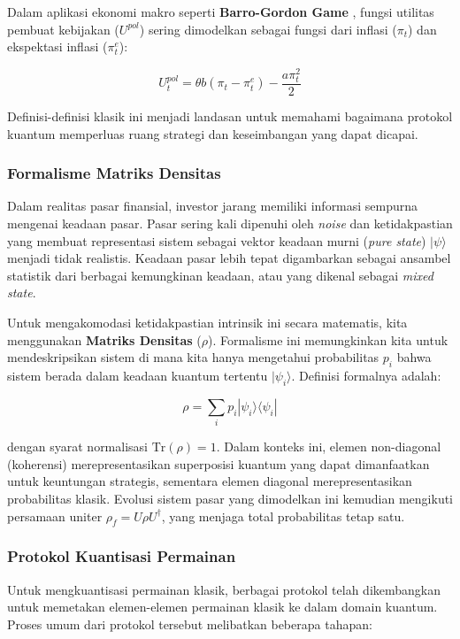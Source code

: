 Dalam aplikasi ekonomi makro seperti \textbf{Barro-Gordon Game} \citep{lowe_linking_2024}, fungsi utilitas pembuat kebijakan ($U^{pol}$) sering dimodelkan sebagai fungsi dari inflasi ($\pi_t$) dan ekspektasi inflasi ($\pi_t^e$):

\[ U^{pol}_t = \theta b (\pi_t - \pi_t^e) - \frac{a \pi_t^2}{2} \]

Definisi-definisi klasik ini menjadi landasan untuk memahami bagaimana protokol kuantum memperluas ruang strategi dan keseimbangan yang dapat dicapai.

\subsubsection{Formalisme Matriks Densitas}

Dalam realitas pasar finansial, investor jarang memiliki informasi sempurna mengenai keadaan pasar. Pasar sering kali dipenuhi oleh \textit{noise} dan ketidakpastian yang membuat representasi sistem sebagai vektor keadaan murni (\textit{pure state}) $|\psi\rangle$ menjadi tidak realistis. Keadaan pasar lebih tepat digambarkan sebagai ansambel statistik dari berbagai kemungkinan keadaan, atau yang dikenal sebagai \textit{mixed state}.

Untuk mengakomodasi ketidakpastian intrinsik ini secara matematis, kita menggunakan \textbf{Matriks Densitas} ($\rho$). Formalisme ini memungkinkan kita untuk mendeskripsikan sistem di mana kita hanya mengetahui probabilitas $p_i$ bahwa sistem berada dalam keadaan kuantum tertentu $|\psi_i\rangle$. Definisi formalnya adalah:

\[ \rho = \sum_i p_i |\psi_i\rangle\langle\psi_i| \]

dengan syarat normalisasi $\text{Tr}(\rho) = 1$. Dalam konteks ini, elemen non-diagonal (koherensi) merepresentasikan superposisi kuantum yang dapat dimanfaatkan untuk keuntungan strategis, sementara elemen diagonal merepresentasikan probabilitas klasik. Evolusi sistem pasar yang dimodelkan ini kemudian mengikuti persamaan uniter $\rho_f = U \rho U^\dagger$, yang menjaga total probabilitas tetap satu.

\subsubsection{Protokol Kuantisasi Permainan}

Untuk mengkuantisasi permainan klasik, berbagai protokol telah dikembangkan untuk memetakan elemen-elemen permainan klasik ke dalam domain kuantum. Proses umum dari protokol tersebut melibatkan beberapa tahapan:


